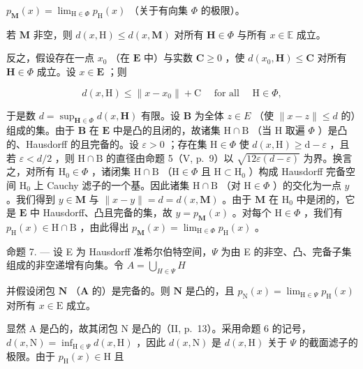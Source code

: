 \(p_{\mathbf{M}}(x) = \lim_{\mathrm{H}\in \Phi}p_{\mathrm{H}}(x)\) （关于有向集 \(\Phi\) 的极限）。

若 \(\mathbf{M}\) 非空，则 \(d(x,\mathrm{H})\leqslant d(x,\mathbf{M})\) 对所有 \(\mathbf{H}\in \Phi\) 与所有 \(x\in \mathbb{E}\) 成立。

反之，假设存在一点 \(x_0\) （在 \(\mathbf{E}\) 中）与实数 \(\mathbf{C} \geqslant 0\) ，使 \(d(x_0, \mathbf{H}) \leqslant \mathbf{C}\) 对所有 \(\mathbf{H} \in \Phi\) 成立。设 \(x \in \mathbf{E}\) ；则

\[
d (x, \mathrm{H}) \leqslant \| x - x _ {0} \| + \mathrm{C} \quad \text { for   all } \quad \mathrm{H} \in \Phi ,
\]

于是数 \(d = \sup_{\mathbf{H} \in \Phi} d(x, \mathbf{H})\) 有限。设 \(\mathbf{B}\) 为全体 \(z \in E\) （使 \(\| x - z\| \leqslant d\) 的）组成的集。由于 \(\mathbf{B}\) 在 \(\mathbf{E}\) 中是凸的且闭的，故诸集 \(\mathrm{H} \cap \mathrm{B}\) （当 \(\mathrm{H}\) 取遍 \(\Phi\) ）是凸的、Hausdorff 的且完备的。设 \(\varepsilon > 0\) ；存在集 \(\mathrm{H} \in \Phi\) 使 \(d(x, \mathrm{H}) \geqslant \mathrm{d} - \varepsilon\) ，且若 \(\varepsilon < d/2\) ，则 \(\mathrm{H} \cap \mathrm{B}\) 的直径由命题 5（V, p.~9）以 \(\sqrt{12\varepsilon(d - \varepsilon)}\) 为界。换言之，对所有 \(\mathrm{H}_0 \in \Phi\) ，诸闭集 \(\mathrm{H} \cap \mathrm{B}\) （\(\mathrm{H} \in \Phi\) 且 \(\mathrm{H} \subset \mathrm{H}_0\) ）构成 Hausdorff 完备空间 \(\mathrm{H}_0\) 上 Cauchy 滤子的一个基。因此诸集 \(\mathrm{H} \cap \mathrm{B}\) （对 \(\mathrm{H} \in \Phi\) ）的交化为一点 \(y\) 。我们得到 \(y \in \mathbf{M}\) 与 \(\| x - y \| = d = d(x, \mathbf{M})\) 。由于 \(\mathbf{M}\) 在 \(\mathrm{H}_0\) 中是闭的，它是 \(\mathbf{E}\) 中 Hausdorff、凸且完备的集，故 \(y = p_{\mathbf{M}}(x)\) 。对每个 \(\mathrm{H} \in \Phi\) ，我们有 \(p_{\mathrm{H}}(x) \in \mathrm{H} \cap \mathrm{B}\) ，由此得出 \(p_{\mathbf{M}}(x) = \lim_{\mathrm{H} \in \Phi} p_{\mathrm{H}}(x)\) 。

命题 7. --- 设 E 为 Hausdorff 准希尔伯特空间，\(\Psi\) 为由 E 的非空、凸、完备子集组成的非空递增有向集。令 \(A = \bigcup_{H \in \Psi} H\)

并假设闭包 \(\mathbf{N}\) （\(\mathbf{A}\) 的）是完备的。则 \(\mathbf{N}\) 是凸的，且 \(p_{\mathrm{N}}(x) = \lim_{\mathrm{H}\in \Psi}p_{\mathrm{H}}(x)\) 对所有 \(x\in \mathrm{E}\) 成立。

显然 A 是凸的，故其闭包 N 是凸的（II, p.~13）。采用命题 6 的记号，\(d(x, \mathrm{N}) = \inf_{\mathrm{H} \in \Psi} d(x, \mathrm{H})\) ，因此 \(d(x, \mathrm{N})\) 是 \(d(x, \mathrm{H})\) 关于 \(\Psi\) 的截面滤子的极限。由于 \(p_{\mathrm{H}}(x) \in \mathrm{H}\) 且

